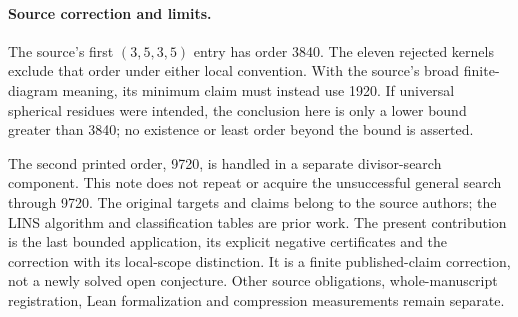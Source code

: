 \documentclass[11pt]{article}
\begin{document}
\paragraph{Source correction and limits.}
The source's first $(3,5,3,5)$ entry has order 3840. The eleven rejected
kernels exclude that order under either local convention. With the
source's broad finite-diagram meaning, its minimum claim must instead
use 1920. If universal spherical residues were intended, the conclusion
here is only a lower bound greater than 3840; no existence or least order
beyond the bound is asserted.

The second printed order, 9720, is handled in a separate divisor-search
component. This note does not repeat or acquire the unsuccessful general
search through 9720. The original targets and claims belong to the source
authors; the LINS algorithm and classification tables are prior work.
The present contribution is the last bounded application, its explicit
negative certificates and the correction with its local-scope distinction.
It is a finite published-claim correction, not a newly solved open
conjecture. Other source obligations, whole-manuscript registration, Lean
formalization and compression measurements remain separate.
\end{document}
